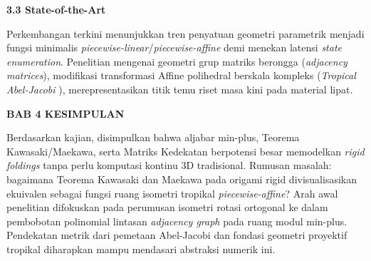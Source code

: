 \documentclass[12pt,a4paper]{article}
\begin{document}
\noindent\textbf{\large 3.3 State-of-the-Art}\par
Perkembangan terkini menunjukkan tren penyatuan geometri parametrik menjadi fungsi minimalis \textit{piecewise-linear}/\textit{piecewise-affine} demi menekan latensi \textit{state enumeration}. Penelitian mengenai geometri grup matriks berongga (\textit{adjacency matrices}), modifikasi transformasi Affine polihedral berskala kompleks (\textit{Tropical Abel-Jacobi} \cite{foster2020metric}), merepresentasikan titik temu riset masa kini pada material lipat.\par

\newpage
\noindent\textbf{\Large BAB 4 KESIMPULAN}\par\bigskip

\noindent Berdasarkan kajian, disimpulkan bahwa aljabar min-plus, Teorema Kawasaki/Maekawa, serta Matriks Kedekatan berpotensi besar memodelkan \textit{rigid foldings} tanpa perlu komputasi kontinu 3D tradisional.
Rumusan masalah: bagaimana Teorema Kawasaki dan Maekawa pada origami rigid divisualisasikan ekuivalen sebagai fungsi ruang isometri tropikal \textit{piecewise-affine}?
Arah awal penelitian difokuskan pada perumusan isometri rotasi ortogonal ke dalam pembobotan polinomial lintasan \textit{adjacency graph} pada ruang modul min-plus. Pendekatan metrik dari pemetaan Abel-Jacobi \cite{foster2020metric} dan fondasi geometri proyektif tropikal \cite{mikhalkin2006tropical} diharapkan mampu mendasari abstraksi numerik ini.

\newpage
\renewcommand{\refname}{\Large DAFTAR PUSTAKA}
\nocite{*}


\end{document}
